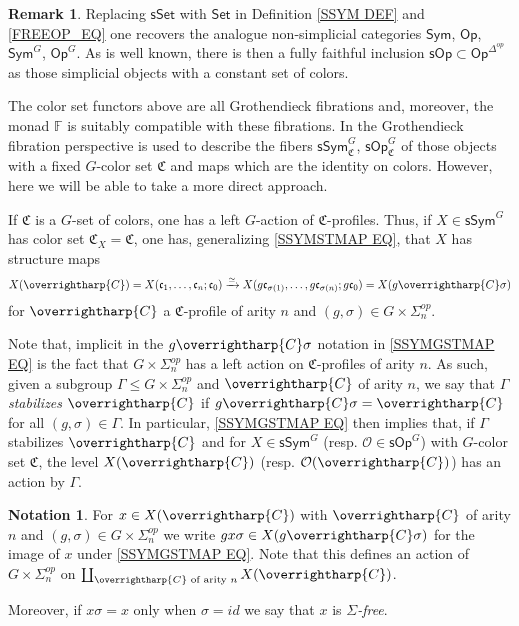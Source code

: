 \documentclass[a4paper,10pt
,draft
]{article}%
\numberwithin{equation}{section}
\numberwithin{figure}{section}
\theoremstyle{definition} %
\newtheorem{remark}[equation]{Remark}%
\newtheorem{notation}[equation]{Notation}%
\newcommand{\vect}[1]{\text{\overrightharp{\ensuremath{#1}}}}
\renewcommand{\O}{\ensuremath{\mathcal O}}
\newcommand{\1}{\ensuremath{\mathbbm 1}}%
\begin{document}
\begin{remark}\label{CTTCOLSET REM}
	Replacing $\mathsf{sSet}$ with 
	$\mathsf{Set}$
	in Definition \ref{SSYM DEF}
	and \eqref{FREEOP_EQ}
	one recovers the analogue non-simplicial categories
	$\mathsf{Sym}$, 
	$\mathsf{Op}$, 
	$\mathsf{Sym}^G$, 
	$\mathsf{Op}^G$. 
%	
	As is well known, there is then a fully faithful inclusion
	$\mathsf{sOp} \subset \mathsf{Op}^{\Delta^{op}}$
	as those simplicial objects with a constant set of colors.
\end{remark}


The color set functors above are all 
Grothendieck fibrations and, moreover, the monad 
$\mathbb{F}$ is suitably compatible with these fibrations.
In \cite[\S \ref{OC-ECO_SEC}]{BP_FCOP} the 
Grothendieck fibration perspective 
is used to describe the fibers 
$\mathsf{sSym}^G_{\mathfrak{C}}$, 
$\mathsf{sOp}^G_{\mathfrak{C}}$
of those objects with a fixed $G$-color set $\mathfrak{C}$
and maps which are the identity on colors. 
However, here we will be able to take a more direct approach.

If $\mathfrak{C}$ is a $G$-set of colors, 
one has a left $G$-action of $\mathfrak{C}$-profiles.
Thus, if $X \in \mathsf{sSym}^G$
has color set $\mathfrak{C}_X =\mathfrak{C}$,
one has, generalizing
\eqref{SSYMSTMAP EQ},
that $X$ has structure maps
\begin{equation}\label{SSYMGSTMAP EQ}
X(\vect{C}) = 
X(\mathfrak c_1, \dots, \mathfrak c_n; \mathfrak c_0) \xrightarrow{\simeq} 
X(g\mathfrak c_{\sigma(1)}, \dots, g \mathfrak c_{\sigma(n)}; g \mathfrak c_0) =	
X(g \vect{C}\sigma)
\end{equation}
for $\vect{C}$ a $\mathfrak{C}$-profile of arity $n$
and
$(g,\sigma) \in G \times \Sigma^{op}_n$.

Note that, implicit in the $g \vect{C} \sigma$ notation in
\eqref{SSYMGSTMAP EQ}
is the fact that $G \times \Sigma_n^{op}$
has a left action on 
$\mathfrak{C}$-profiles of arity $n$.
As such, given a subgroup
$\Gamma \leq G \times \Sigma_n^{op}$
and $\vect{C}$ of arity $n$, we say that 
\emph{$\Gamma$ stabilizes $\vect{C}$} 
if 
$g \vect{C} \sigma = \vect{C}$
for all $(g,\sigma) \in \Gamma$.
In particular, 
\eqref{SSYMGSTMAP EQ}
then implies that, 
if $\Gamma$ stabilizes $\vect{C}$
and for
$X\in \mathsf{sSym}^G$
(resp.
$\O \in \mathsf{sOp}^G$)
with $G$-color set $\mathfrak{C}$,
the level
$X(\vect{C})$
(resp. $\O(\vect{C})$)
has an action by $\Gamma$.


\begin{notation}\label{SIGFREE NOT}
	For $x \in X(\vect{C})$
	with $\vect{C}$ of arity $n$ and 
	$(g,\sigma) \in G \times \Sigma_n^{op}$
	we write
	$gx\sigma \in X(g \vect{C} \sigma)$
	for the image of $x$ under 
	\eqref{SSYMGSTMAP EQ}.
	Note that this defines an action of
	$G \times \Sigma_n^{op}$
	on $\coprod_{\vect{C} \text{ of arity }n} X(\vect{C})$.
	
	Moreover, if $x \sigma = x$ only when $\sigma = id$ 
	we say that $x$ is \emph{$\Sigma$-free}.
\end{notation}
\end{document}
